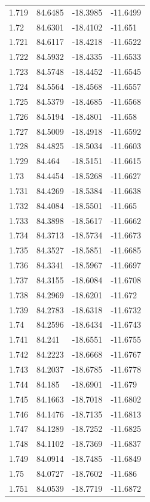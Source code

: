 \begin{tabular}{llll}
1.719 & 84.6485 & -18.3985 & -11.6499 \\
1.72 & 84.6301 & -18.4102 & -11.651 \\
1.721 & 84.6117 & -18.4218 & -11.6522 \\
1.722 & 84.5932 & -18.4335 & -11.6533 \\
1.723 & 84.5748 & -18.4452 & -11.6545 \\
1.724 & 84.5564 & -18.4568 & -11.6557 \\
1.725 & 84.5379 & -18.4685 & -11.6568 \\
1.726 & 84.5194 & -18.4801 & -11.658 \\
1.727 & 84.5009 & -18.4918 & -11.6592 \\
1.728 & 84.4825 & -18.5034 & -11.6603 \\
1.729 & 84.464 & -18.5151 & -11.6615 \\
1.73 & 84.4454 & -18.5268 & -11.6627 \\
1.731 & 84.4269 & -18.5384 & -11.6638 \\
1.732 & 84.4084 & -18.5501 & -11.665 \\
1.733 & 84.3898 & -18.5617 & -11.6662 \\
1.734 & 84.3713 & -18.5734 & -11.6673 \\
1.735 & 84.3527 & -18.5851 & -11.6685 \\
1.736 & 84.3341 & -18.5967 & -11.6697 \\
1.737 & 84.3155 & -18.6084 & -11.6708 \\
1.738 & 84.2969 & -18.6201 & -11.672 \\
1.739 & 84.2783 & -18.6318 & -11.6732 \\
1.74 & 84.2596 & -18.6434 & -11.6743 \\
1.741 & 84.241 & -18.6551 & -11.6755 \\
1.742 & 84.2223 & -18.6668 & -11.6767 \\
1.743 & 84.2037 & -18.6785 & -11.6778 \\
1.744 & 84.185 & -18.6901 & -11.679 \\
1.745 & 84.1663 & -18.7018 & -11.6802 \\
1.746 & 84.1476 & -18.7135 & -11.6813 \\
1.747 & 84.1289 & -18.7252 & -11.6825 \\
1.748 & 84.1102 & -18.7369 & -11.6837 \\
1.749 & 84.0914 & -18.7485 & -11.6849 \\
1.75 & 84.0727 & -18.7602 & -11.686 \\
1.751 & 84.0539 & -18.7719 & -11.6872 \\

\end{tabular}
